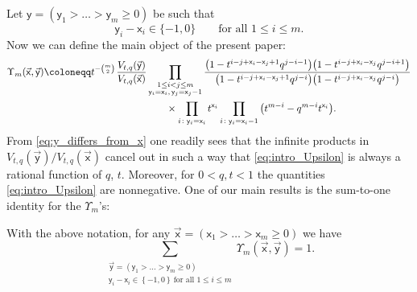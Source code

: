Let $\mathsf{y}=(\mathsf{y}_1>\dots>\mathsf{y}_m\ge0 )$
be such that
\begin{equation}\label{eq:y_differs_from_x}
	\mathsf{y}_i-\mathsf{x}_i\in \{ -1,0 \}
	\qquad
	\text{for all $1\le i\le m$}.
\end{equation}
Now we can define the main object of the present paper:
\begin{gather}
\Upsilon_m(\vec{\mathsf{x}},\vec{\mathsf{y}})
		\coloneqq
		t^{-\binom m2}	
		\hspace{1pt}
		\frac
		{V_{t,q}(\vec{\mathsf{y}})}
		{V_{t,q}(\vec{\mathsf{x}})}
		\prod_{\substack{1\le i<j\le m
		\\
		\mathsf{y}_{i}=\mathsf{x}_{i}
		,\,
		\mathsf{y}_{j}=\mathsf{x}_{j}-1}}
		\frac{\big(1-t^{i-j+\mathsf{x}_{i}-\mathsf{x}_{j}+1}
		q^{j-i-1}\big)
		\big(1-t^{i-j+\mathsf{x}_{i}-\mathsf{x}_{j}} q^{j-i+1}\big)}
		{\big(1-t^{i-j+\mathsf{x}_{i}-\mathsf{x}_{j}+1} q^{j-i}\big)
		\big(1-t^{i-j+\mathsf{x}_{i}-\mathsf{x}_{j}} q^{j-i}\big)}
		\nonumber\\
\hphantom{\Upsilon_m(\vec{\mathsf{x}},\vec{\mathsf{y}}) \coloneqq}{}
\times\prod_{i\colon \mathsf{y}_i=\mathsf{x}_i}
		t^{\mathsf{x}_i}
		\prod_{i\colon \mathsf{y}_i=\mathsf{x}_i-1}
		\big(t^{m-i}-q^{m-i}t^{\mathsf{x}_i}\big)		.\label{eq:intro_Upsilon}
\end{gather}
From \eqref{eq:y_differs_from_x}
one readily sees that the infinite products in
${V_{t,q}(\vec{\mathsf{y}})}/{V_{t,q}(\vec{\mathsf{x}})}$
cancel out in such a way that
\eqref{eq:intro_Upsilon} is always a rational function of $q$, $t$.
Moreover, for $0<q,t<1$ the quantities \eqref{eq:intro_Upsilon}
are nonnegative.
One of our main results is the sum-to-one identity for the
$\Upsilon_m$'s:
\begin{Theorem}
	\label{thm:Macdonald_noncolliding_intro}
	With the above notation,
	for any $\vec{\mathsf{x}}=(\mathsf{x}_1>\dots>\mathsf{x}_m\ge0 )$
	we have
	\begin{equation*}
		\sum_{
			\substack{\vec{\mathsf{y}}=
			(\mathsf{y}_1>\dots>\mathsf{y}_m\ge0 )
			\\
			\mathsf{y}_i-\mathsf{x}_i\in \left\{ -1,0 \right\}
			\
			\text{for all $1\le i\le m$}
			}
		}
		\Upsilon_m(\vec{\mathsf{x}},\vec{\mathsf{y}})=1.
	\end{equation*}
\end{Theorem}
